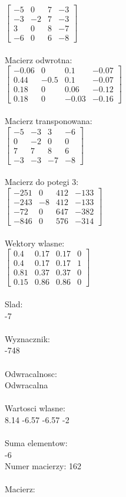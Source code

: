 \documentclass[a4paper,12pt]{article}
\begin{document}
$\begin{bmatrix} -5&0&7&-3\\-3&-2&7&-3\\3&0&8&-7\\-6&0&6&-8 \end{bmatrix}$
\\
\\
Macierz odwrotna:\\

$\begin{bmatrix} -0.06&0&0.1&-0.07\\0.44&-0.5&0.1&-0.07\\0.18&0&0.06&-0.12\\0.18&0&-0.03&-0.16 \end{bmatrix}$
\\
\\
Macierz transponowana:\\

$\begin{bmatrix} -5&-3&3&-6\\0&-2&0&0\\7&7&8&6\\-3&-3&-7&-8 \end{bmatrix}$
\\
\\
Macierz do potegi 3:\\

$\begin{bmatrix} -251&0&412&-133\\-243&-8&412&-133\\-72&0&647&-382\\-846&0&576&-314 \end{bmatrix}$
\\
\\
Wektory wlasne:\\

$\begin{bmatrix} 0.4&0.17&0.17&0\\0.4&0.17&0.17&1\\0.81&0.37&0.37&0\\0.15&0.86&0.86&0 \end{bmatrix}$
\\
\\
Slad:\\
-7
\\
\\
Wyznacznik:\\
-748
\\
\\
Odwracalnosc:\\
Odwracalna
\\
\\
Wartosci wlasne:\\
8.14 -6.57 -6.57 -2
\\
\\
Suma elementow:\\
-6
\\
\newpage
Numer macierzy:
162
\\
\\
Macierz:\\
\end{document}
